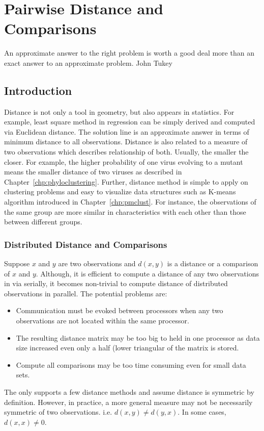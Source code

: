 \chapter{Pairwise Distance and Comparisons}
\label{chp:pairwise}

\inspire%
{An approximate answer to the right problem is worth a good deal more than
an exact answer to an approximate problem.}%
{John Tukey}


\section{Introduction}

Distance is not only a tool in geometry, but also appears in statistics. For
example, least square method in regression can be simply derived and computed
via Euclidean distance. The solution line is an approximate answer
in terms of minimum distance to all observations. Distance is also related
to a measure of two observations which describes relationship of both.
Usually, the smaller the closer. For example, the higher probability of
one virus evolving to a mutant means the smaller distance of two viruses
as described in Chapter~\ref{chp:phyloclustering}.
Further, distance method is simple to apply on clustering problems
and easy to visualize data structures such as K-means algorithm
introduced in Chapter~\ref{chp:pmclust}. For instance,
the observations of the same group are more similar in characteristics with
each other than those between different groups.


\subsection{Distributed Distance and Comparisons}

Suppose $x$ and $y$ are two observations and $d(x, y)$ is a distance or
a comparison of $x$ and $y$.
Although, it is efficient to compute a distance of any two observations
in  via  serially, it becomes non-trivial to
compute distance of distributed observations in parallel.
The potential problems are:
\begin{itemize}
\item
Communication must be evoked between processors when any two observations
are not located within the same processor.
\item
The resulting distance matrix may be too big
to held in one processor as data size increased even only a half (lower
triangular of the matrix is stored.
\item
Compute all comparisons may be too time consuming even for small data sets. 
\end{itemize}

The  only supports a few distance methods and assume
distance is symmetric by definition. However,
in practice, a more general measure may not be necessarily
symmetric of two observations. i.e. $d(x, y) \neq d(y, x)$.
In some cases, $d(x, x) \neq 0$.

